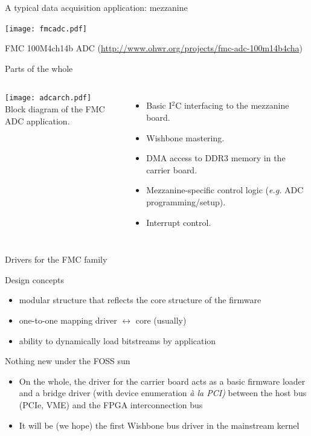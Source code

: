 \documentclass[compress,red]{beamer}
\begin{document}
\begin{frame}{A typical data acquisition application: mezzanine}
\begin{center}
\texttt{[image: fmcadc.pdf]}
\end{center}
\centering
FMC 100M4ch14b ADC
(\url{http://www.ohwr.org/projects/fmc-adc-100m14b4cha})
\end{frame}

\begin{frame}{Parts of the whole}
\begin{columns}[c]
   \centering
   \texttt{[image: adcarch.pdf]}\\
   \vspace{1pc}
   {\footnotesize
       Block diagram of the FMC ADC application.}
\footnotesize
\begin{itemize}
\pause\item Basic I${}^2$C interfacing to the mezzanine board.
\pause\item Wishbone mastering.
\pause\item DMA access to DDR3 memory in the carrier board.
\pause\item Mezzanine-specific control logic (\emph{e.g.} ADC programming/setup).
\pause\item Interrupt control.
\end{itemize}
\end{columns}
\end{frame}

\begin{frame}{Drivers for the FMC family}

\begin{block}{Design concepts}
\begin{itemize}
\pause
\item modular structure that reflects the core structure of the firmware
\pause
\item one-to-one mapping driver $\leftrightarrow$ core (usually)
\pause
\item ability to dynamically load bitstreams by application
\end{itemize}
\end{block}

\pause
\begin{block}{Nothing new under the FOSS sun}
\begin{itemize}
\pause\item
On the whole, the driver for the carrier board acts as a basic firmware
loader and a bridge driver (with device enumeration
\emph{\`a la PCI)} between the host bus (PCIe, VME) and the FPGA
interconnection bus
\pause\item
It will be (we hope) the first Wishbone bus driver in the mainstream
kernel
\end{itemize}
\end{block}

\end{frame}
\end{document}
